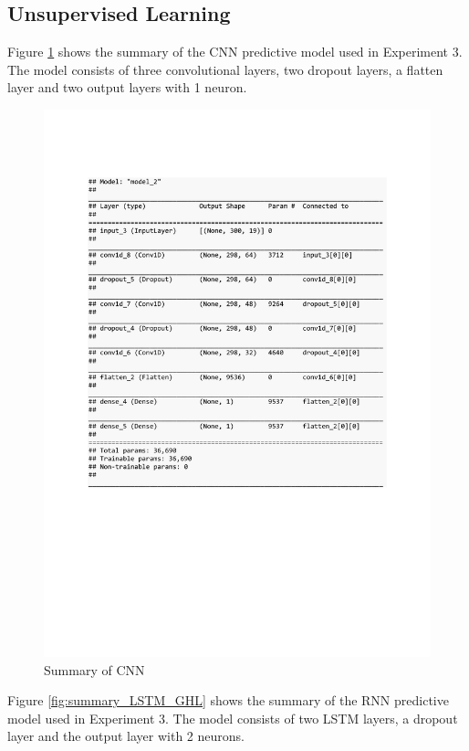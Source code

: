 \subsection{Unsupervised Learning}
Figure \ref{fig:summary_CNN_GHL} shows the summary of the CNN predictive model used in Experiment 3. The model consists of three convolutional layers, two dropout layers, a flatten layer and two output layers with 1 neuron.
\begin{figure}[h]
	\centering
	\includegraphics[scale=0.5]{Figures/summary_CNN_GHL}
	\decoRule
	\caption[Experiment 3: Summary of CNN for unsupervised learning]{Summary of CNN \parencite{own}}
	\label{fig:summary_CNN_GHL}
\end{figure}
\clearpage
Figure \ref{fig:summary_LSTM_GHL} shows the summary of the RNN predictive model used in Experiment 3. The model consists of two LSTM layers, a dropout layer and the output layer with 2 neurons.
